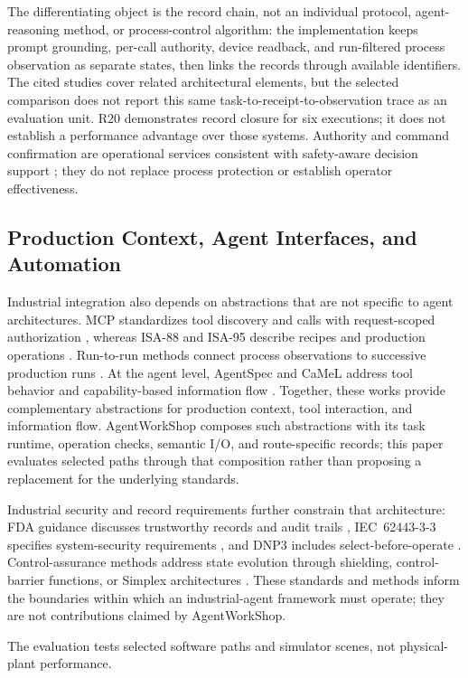 The differentiating object is the record chain, not an individual protocol,
agent-reasoning method, or process-control algorithm: the implementation keeps
prompt grounding, per-call authority, device readback, and run-filtered process
observation as separate states, then links the records through available
identifiers. The cited studies cover related architectural elements, but the
selected comparison does not report this same task-to-receipt-to-observation
trace as an evaluation unit. R20 demonstrates record closure for six
executions; it does not establish a performance advantage over those systems.
Authority and command confirmation are operational services consistent with
safety-aware decision support \cite{jiang2026agentic}; they do not replace
process protection or establish operator effectiveness.

\subsection{Production Context, Agent Interfaces, and Automation}
Industrial integration also depends on abstractions that are not specific to
agent architectures. MCP standardizes tool discovery and calls with
request-scoped authorization \cite{mcp2024}, whereas
ISA-88 and ISA-95 describe recipes and production operations
\cite{isa88_2010,isa95_2025}. Run-to-run methods connect process observations
to successive production runs \cite{moyne2000r2r}. At the agent level,
AgentSpec and CaMeL address tool behavior and capability-based information
flow \cite{wang2025agentspec,debenedetti2025camel}. Together, these works
provide complementary abstractions for production context, tool interaction,
and information flow. AgentWorkShop composes such abstractions with its task
runtime, operation checks, semantic I/O, and route-specific records; this
paper evaluates selected paths through that composition rather than proposing
a replacement for the underlying standards.

Industrial security and record requirements further constrain that
architecture: FDA guidance discusses trustworthy records and audit trails
\cite{part11}, IEC~62443-3-3 specifies system-security requirements
\cite{iec62443-3-3}, and DNP3 includes select-before-operate
\cite{ieee1815dnp3}. Control-assurance methods address state evolution through
shielding, control-barrier functions, or Simplex architectures
\cite{alshiekh2018shielding,ames2017cbf,sha2001simplex}. These standards and
methods inform the boundaries within which an industrial-agent framework must
operate; they are not contributions claimed by AgentWorkShop.

The evaluation tests selected software paths and simulator scenes, not
physical-plant performance.
